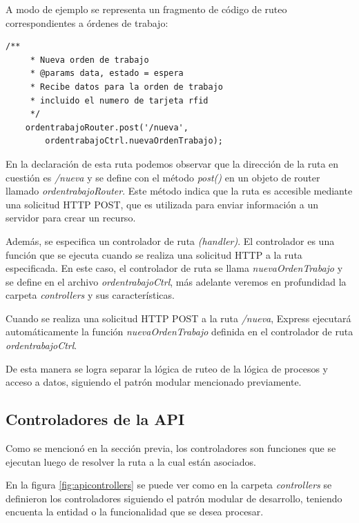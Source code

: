 A modo de ejemplo se representa un fragmento de código de ruteo correspondientes a órdenes de trabajo:


\begin{lstlisting}[label=cod:routesot,caption=Código de ruteo para órdenes de trabajo.]
    /**
     * Nueva orden de trabajo
     * @params data, estado = espera
     * Recibe datos para la orden de trabajo
     * incluido el numero de tarjeta rfid
     */
    ordentrabajoRouter.post('/nueva',
        ordentrabajoCtrl.nuevaOrdenTrabajo);
\end{lstlisting}

En la declaración de esta ruta podemos observar que la dirección de la ruta en cuestión es \textit{/nueva} y se define con el método \textit{post()} en un objeto de router llamado \textit{ordentrabajoRouter}. Este método indica que la ruta es accesible mediante una solicitud HTTP POST, que es utilizada para enviar información a un servidor para crear un recurso.

Además, se especifica un controlador de ruta \textit{(handler)}. El controlador es una función que se ejecuta cuando se realiza una solicitud HTTP a la ruta especificada. En este caso, el controlador de ruta se llama \textit{nuevaOrdenTrabajo} y se define en el archivo \textit{ordentrabajoCtrl}, más adelante veremos en profundidad la carpeta \textit{controllers} y sus características.

Cuando se realiza una solicitud HTTP POST a la ruta \textit{/nueva}, Express ejecutará automáticamente la función \textit{nuevaOrdenTrabajo} definida en el controlador de ruta \textit{ordentrabajoCtrl}.

De esta manera se logra separar la lógica de ruteo de la lógica de procesos y acceso a datos, siguiendo el patrón modular mencionado previamente.

\subsection{Controladores de la API}
\label{subsec:apicontrollers}

Como se mencionó en la sección previa, los controladores son funciones que se ejecutan luego de resolver la ruta a la cual están asociados. 

En la figura \ref{fig:apicontrollers} se puede ver como en la carpeta \textit{controllers} se definieron los controladores siguiendo el patrón modular de desarrollo, teniendo encuenta la entidad o la funcionalidad que se desea procesar.

